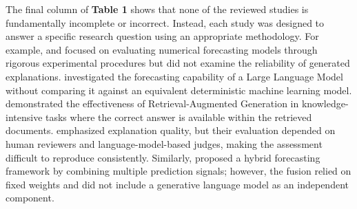 \begin{table}[H]
\centering
\scriptsize
\setlength{\tabcolsep}{2.8pt}
\caption{Capability comparison against six studies. ``n/a'' marks a capability that is not applicable to that study's design rather than a shortcoming of it.}
\label{tab:capability-comparison}
\end{table}

The final column of \textbf{Table 1} shows that none of the reviewed
studies is fundamentally incomplete or incorrect. Instead, each study
was designed to answer a specific research question using an appropriate
methodology. For example, \citet{nelson2017} and \citet{gu2020}
focused on evaluating numerical forecasting models through rigorous
experimental procedures but did not examine the reliability of generated
explanations. \citet{lopezlira2023} investigated the forecasting
capability of a Large Language Model without comparing it against an
equivalent deterministic machine learning model. \citet{lewis2020}
demonstrated the effectiveness of Retrieval-Augmented Generation in
knowledge-intensive tasks where the correct answer is available within
the retrieved documents. \citet{yu2024} emphasized explanation
quality, but their evaluation depended on human reviewers and
language-model-based judges, making the assessment difficult to
reproduce consistently. Similarly, \citet{fatouros2024} proposed a
hybrid forecasting framework by combining multiple prediction signals;
however, the fusion relied on fixed weights and did not include a
generative language model as an independent component.

